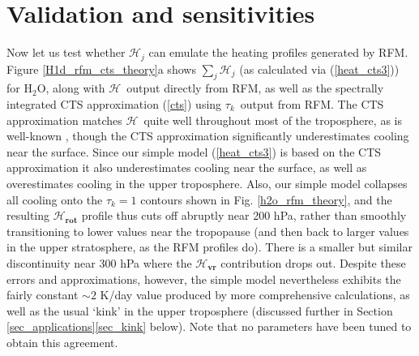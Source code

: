 \documentclass{ametsoc}
\newcommand{\eqnref}[1]{(\ref{#1})}
\newcommand{\htwo}{\ensuremath{\mathrm{H_2O}}}
\newcommand{\ch}{\ensuremath{\mathcal{H}}}
\newcommand{\tauk}{\ensuremath{\tau_k}}
\newcommand{\vr}{\ensuremath{\mathbf{vr}}}
\newcommand{\rot}{\ensuremath{\mathbf{rot}}}
\begin{document}
 \section{Validation and sensitivities} \label{sec_validation}
 Now let us test  whether $\ch_j$ can emulate the heating profiles generated by RFM. Figure \ref{H1d_rfm_cts_theory}a shows  $\sum_j \ch_j$ (as calculated via \eqnref{heat_cts3}) for \htwo, along with \ch\  output directly from RFM, as well as the spectrally integrated CTS approximation \eqnref{cts} using \tauk\ output from RFM. The CTS approximation matches \ch\ quite well throughout most of the troposphere, as is well-known \citep{clough1992,stephens1984,rodgers1966}, though the CTS approximation significantly underestimates cooling near the surface. Since our simple model \eqnref{heat_cts3} is based on the CTS approximation it also underestimates cooling near the surface, as well as  overestimates cooling in the upper troposphere. Also, our simple model collapses all cooling onto the $\tauk=1$ contours shown in Fig. \ref{h2o_rfm_theory}, and the resulting $\ch_{\rot}$ profile thus cuts off abruptly near 200 hPa, rather than smoothly transitioning to lower values near the tropopause (and then back to larger values in the upper stratosphere, as the RFM profiles do). There is a smaller but similar discontinuity near 300 hPa where the $\ch_{\vr}$ contribution drops out. Despite these errors and approximations, however, the simple model nevertheless exhibits the fairly constant $\sim 2$ K/day value produced by more comprehensive calculations, as well as the usual `kink' in the upper troposphere (discussed further in Section \ref{sec_applications}\ref{sec_kink} below). Note that no parameters have been tuned to obtain this agreement. 
 
\end{document}

